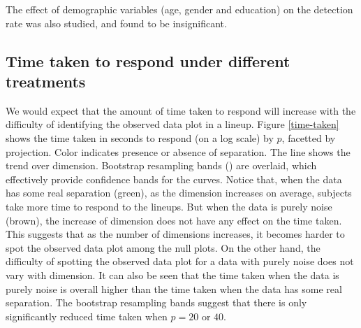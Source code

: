 The effect of demographic variables (age, gender and education) on the detection rate was also studied, and found to be insignificant. 




\subsection{Time taken to respond under different treatments}

We would expect that the amount of time taken to respond will increase with the difficulty of identifying the observed data plot in a lineup. Figure \ref{time-taken} shows the time taken in seconds to respond (on a log scale) by $p$, facetted by projection. Color indicates presence or absence of separation. The line shows the trend over dimension. Bootstrap resampling bands (\cite{buja:2005}) are overlaid, which effectively provide confidence bands for the curves. Notice that,  when the data has some real separation (green), as the dimension increases on average,  subjects take more time to respond to the lineups. But when the data is purely noise (brown), the increase of dimension does not have any effect on the time taken. This suggests that as the number of dimensions increases, it becomes harder to spot the observed data plot among the null plots. On the other hand, the difficulty of spotting the observed data plot for a data with purely noise does not vary with dimension. It can also be seen that the time taken when the data is purely noise is overall higher than the time taken when the data has some real separation. The bootstrap resampling bands suggest that there is only significantly reduced time taken when $p=20$ or $40$. 



